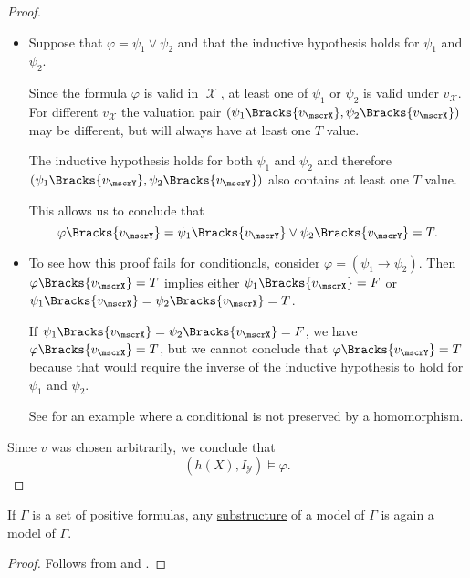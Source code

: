 \begin{proof}
\begin{itemize}
    \item Suppose that \( \varphi = \psi_1 \vee \psi_2 \) and that the inductive hypothesis holds for \( \psi_1 \) and \( \psi_2 \).

    Since the formula \( \varphi \) is valid in \( \mscrX \), at least one of \( \psi_1 \) or \( \psi_2 \) is valid under \( v_\mscrX \). For different \( v_\mscrX \) the valuation pair \( (\psi_1\Bracks{v_\mscrX}, \psi_2\Bracks{v_\mscrX}) \) may be different, but will always have at least one \( T \) value.

    The inductive hypothesis holds for both \( \psi_1 \) and \( \psi_2 \) and therefore \( (\psi_1\Bracks{v_\mscrY}, \psi_2\Bracks{v_\mscrY}) \) also contains at least one \( T \) value.

    This allows us to conclude that
    \begin{equation*}
      \varphi\Bracks{v_\mscrY}
      =
      \psi_1\Bracks{v_\mscrY} \vee \psi_2\Bracks{v_\mscrY}
      =
      T.
    \end{equation*}

    \item To see how this proof fails for conditionals, consider \( \varphi = (\psi_1 \rightarrow \psi_2) \). Then \( \varphi\Bracks{v_\mscrX} = T \) implies either \( \psi_1\Bracks{v_\mscrX} = F \) or \( \psi_1\Bracks{v_\mscrX} = \psi_2\Bracks{v_\mscrX} = T \).

    If \( \psi_1\Bracks{v_\mscrX} = \psi_2\Bracks{v_\mscrX} = F \), we have \( \varphi\Bracks{v_\mscrX} = T \), but we cannot conclude that \( \varphi\Bracks{v_\mscrY} = T \) because that would require the \hyperref[def:material_implication/inverse]{inverse} of the inductive hypothesis to hold for \( \psi_1 \) and \( \psi_2 \).

    See  for an example where a conditional is not preserved by a homomorphism.
  \end{itemize}

  Since \( v \) was chosen arbitrarily, we conclude that
  \begin{equation*}
    (h(X), I_\mscrY) \vDash \varphi.
  \end{equation*}
\end{proof}

\begin{corollary}\label{thm:substructure_is_model}
  If \( \Gamma \) is a set of positive formulas, any \hyperref[def:first_order_substructure]{substructure} of a model of \( \Gamma \) is again a model of \( \Gamma \).
\end{corollary}
\begin{proof}
  Follows from  and .
\end{proof}

